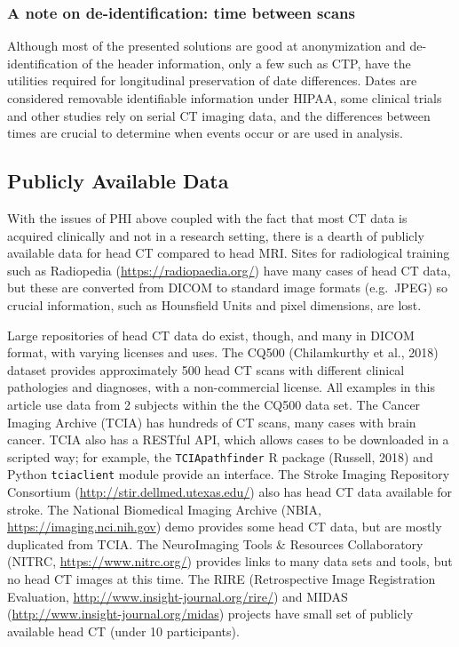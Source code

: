 \documentclass[utf8]{frontiersSCNS}
\begin{document}
\hypertarget{a-note-on-de-identification-time-between-scans}{%
\subsubsection{A note on de-identification: time between scans}\label{a-note-on-de-identification-time-between-scans}}

Although most of the presented solutions are good at anonymization and de-identification of the header information, only a few such as CTP, have the utilities required for longitudinal preservation of date differences. Dates are considered removable identifiable information under HIPAA, some clinical trials and other studies rely on serial CT imaging data, and the differences between times are crucial to determine when events occur or are used in analysis.

\hypertarget{publicly-available-data}{%
\subsection{Publicly Available Data}\label{publicly-available-data}}

With the issues of PHI above coupled with the fact that most CT data is acquired clinically and not in a research setting, there is a dearth of publicly available data for head CT compared to head MRI. Sites for radiological training such as Radiopedia (\url{https://radiopaedia.org/}) have many cases of head CT data, but these are converted from DICOM to standard image formats (e.g.~JPEG) so crucial information, such as Hounsfield Units and pixel dimensions, are lost.

Large repositories of head CT data do exist, though, and many in DICOM format, with varying licenses and uses. The CQ500 (Chilamkurthy et al., 2018) dataset provides approximately 500 head CT scans with different clinical pathologies and diagnoses, with a non-commercial license. All examples in this article use data from 2 subjects within the the CQ500 data set. The Cancer Imaging Archive (TCIA) has hundreds of CT scans, many cases with brain cancer. TCIA also has a RESTful API, which allows cases to be downloaded in a scripted way; for example, the \texttt{TCIApathfinder} R package (Russell, 2018) and Python \texttt{tciaclient} module provide an interface. The Stroke Imaging Repository Consortium (\url{http://stir.dellmed.utexas.edu/}) also has head CT data available for stroke. The National Biomedical Imaging Archive (NBIA, \url{https://imaging.nci.nih.gov}) demo provides some head CT data, but are mostly duplicated from TCIA. The NeuroImaging Tools \& Resources Collaboratory (NITRC, \url{https://www.nitrc.org/}) provides links to many data sets and tools, but no head CT images at this time. The RIRE (Retrospective Image Registration Evaluation, \url{http://www.insight-journal.org/rire/}) and MIDAS (\url{http://www.insight-journal.org/midas}) projects have small set of publicly available head CT (under 10 participants).
\end{document}
